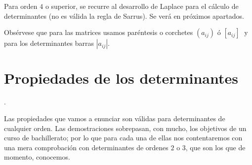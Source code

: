 Para orden $4$ o superior, se recurre al desarrollo de Laplace para el cálculo de determinantes (no es válida la regla de Sarrus). Se verá en próximos apartados.

Obsérvese que para las matrices usamos paréntesis o corchetes $(a_{ij}) \text{ ó } [a_{ij}]\; $ y para los determinantes barras $|a_{ij}|$.

\section{Propiedades de los determinantes}.

Las propiedades que vamos a enunciar son válidas para determinantes de cualquier orden. Las demostraciones sobrepasan, con mucho, los objetivos de un curso de bachillerato; por lo que para cada una de ellas nos contentaremos con una mera comprobación con determinantes de ordenes $2$ o $3$, que son los que de momento, conocemos.

